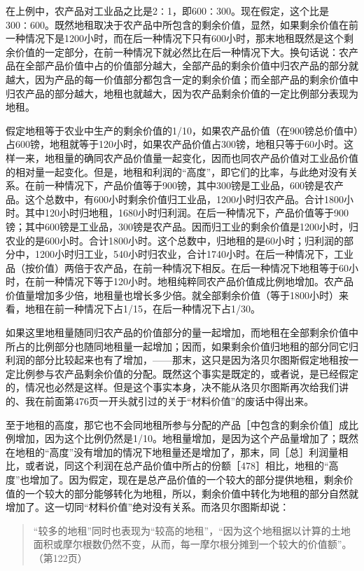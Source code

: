 在上例中，农产品对工业品之比是2∶1，即600∶300。现在假定，这个比是300∶600。既然地租取决于农产品中所包含的剩余价值，显然，如果剩余价值在前一种情况下是1200小时，而在后一种情况下只有600小时，那末地租既然是这个剩余价值的一定部分，在前一种情况下就必然比在后一种情况下大。换句话说：农产品在全部产品价值中占的价值部分越大，全部产品的剩余价值中归农产品的部分就越大，因为产品的每一价值部分都包含一定的剩余价值；而全部产品的剩余价值中归农产品的部分越大，地租也就越大，因为农产品剩余价值的一定比例部分表现为地租。

假定地租等于农业中生产的剩余价值的1/10，如果农产品价值（在900镑总价值中）占600镑，地租就等于120小时，如果农产品价值占300镑，地租只等于60小时。这样一来，地租量的确同农产品价值量一起变化，因而也同农产品价值对工业品价值的相对量一起变化。但是，地租和利润的“高度”，即它们的比率，与此绝对没有关系。在前一种情况下，产品价值等于900镑，其中300镑是工业品，600镑是农产品。这个总数中，有600小时剩余价值归工业品，1200小时归农产品。合计1800小时。其中120小时归地租，1680小时归利润。在后一种情况下，产品价值等于900镑；其中600镑是工业品，300镑是农产品。因而归工业的剩余价值是1200小时，归农业的是600小时。合计1800小时。这个总数中，归地租的是60小时；归利润的部分中，1200小时归工业，540小时归农业，合计1740小时。在后一种情况下，工业品（按价值）两倍于农产品，在前一种情况下相反。在后一种情况下地租等于60小时，在前一种情况下等于120小时。地租纯粹同农产品价值成比例地增加。农产品价值量增加多少倍，地租量也增长多少倍。就全部剩余价值（等于1800小时）来看，地租在前一种情况下占1/15，在后一种情况下占1/30。

如果这里地租量随同归农产品的价值部分的量一起增加，而地租在全部剩余价值中所占的比例部分也随同地租量一起增加；因而，如果剩余价值归地租的部分同它归利润的部分比较起来也有了增加，——那末，这只是因为洛贝尔图斯假定地租按一定比例参与农产品剩余价值的分配。既然这个事实是既定的，或者说，是已经假定的，情况也必然是这样。但是这个事实本身，决不能从洛贝尔图斯再次给我们讲的、我在前面第476页一开头就引过的关于“材料价值”的废话中得出来。

至于地租的高度，那它也不会同地租所参与分配的产品［中包含的剩余价值］成比例增加，因为这个比例仍然是1/10。地租量增加，是因为这个产品量增加了；既然在地租的“高度”没有增加的情况下地租量还是增加了，那末，同［总］利润量相比，或者说，同这个利润在总产品价值中所占的份额［478］相比，地租的“高度”也增加了。因为假定，现在是总产品价值的一个较大的部分提供地租，剩余价值的一个较大的部分能够转化为地租，所以，剩余价值中转化为地租的部分自然就增加了。这一切同“材料价值”绝对没有关系。而洛贝尔图斯却说：

\begin{quote}{“较多的地租”同时也表现为“较高的地租”，“因为这个地租据以计算的土地面积或摩尔根数仍然不变，从而，每一摩尔根分摊到一个较大的价值额”。（第122页）}\end{quote}

